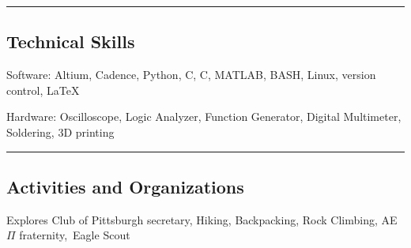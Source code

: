 \documentclass[10pt,letterpaper]{article}
\newenvironment{indentsection}[1]%
{\begin{list}{}%
	{\setlength{\leftmargin}{#1}}%
	\item[]%
}
{\end{list}}
\newcommand{\CPP}
{C\nolinebreak[4]\hspace{-.05em}\raisebox{.22ex}{\footnotesize\bf ++}}
\begin{document}
\hrule
\vspace{-0.4em}
\subsection*{Technical Skills}

\begin{description*}
	\item[Software:]
	 Altium, Cadence, Python, C, \CPP , MATLAB, BASH, Linux, version control, \LaTeX
	\item[Hardware:]
	Oscilloscope, Logic Analyzer, Function Generator, Digital Multimeter, Soldering, 3D printing
\end{description*}

\hrule
\vspace{-0.4em}
\subsection*{Activities and Organizations}
\indent Explores Club of Pittsburgh secretary, Hiking, Backpacking, Rock Climbing, AE$\Pi$ fraternity,\, Eagle Scout
\end{document}
